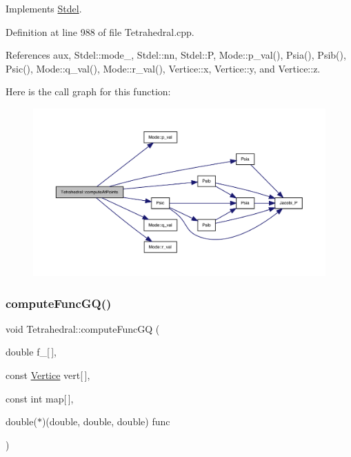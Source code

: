 Implements \hyperlink{classStdel_a03e038055d238608efce470629863c36}{Stdel}.



Definition at line 988 of file Tetrahedral.\+cpp.



References aux, Stdel\+::mode\+\_\+, Stdel\+::nn, Stdel\+::P, Mode\+::p\+\_\+val(), Psia(), Psib(), Psic(), Mode\+::q\+\_\+val(), Mode\+::r\+\_\+val(), Vertice\+::x, Vertice\+::y, and Vertice\+::z.

Here is the call graph for this function\+:
\nopagebreak
\begin{figure}[H]
\begin{center}
\leavevmode
\includegraphics[width=350pt]{classTetrahedral_afba2976521f6a8f5dab936879d3f16da_cgraph}
\end{center}
\end{figure}
\mbox{\label{classTetrahedral_af2ec99051969b2753ec24e72b9b108f7}} 
\subsubsection{\texorpdfstring{compute\+Func\+G\+Q()}{computeFuncGQ()}}
{\footnotesize\ttfamily void Tetrahedral\+::compute\+Func\+GQ (\begin{DoxyParamCaption}\item[{double}]{f\+\_\+\mbox{[}$\,$\mbox{]},  }\item[{const \hyperlink{structVertice}{Vertice}}]{vert\mbox{[}$\,$\mbox{]},  }\item[{const int}]{map\mbox{[}$\,$\mbox{]},  }\item[{double($\ast$)(double, double, double)}]{func }\end{DoxyParamCaption})\hspace{0.3cm}{\ttfamily [virtual]}}



